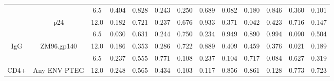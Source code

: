 \documentclass[12pt]{article} %
\begin{document}
\begin{tabular}{ccccccccccccc}
 &  & 6.5 & 0.404 & 0.828 & 0.243 & 0.250 & 0.689 & 0.082 & 0.180 & 0.846 & 0.360 & 0.101\\
\cmidrule{3-13}
 & \multirow{-3}{*}{\centering\arraybackslash p24} & 12.0 & 0.182 & 0.721 & 0.237 & 0.676 & 0.933 & 0.371 & 0.042 & 0.423 & 0.716 & 0.147\\
\cmidrule{2-13}
 &  & 6.5 & 0.030 & 0.631 & 0.244 & 0.750 & 0.234 & 0.949 & 0.890 & 0.994 & 0.090 & 0.504\\
\cmidrule{3-13}
\multirow{-12}{*}{\centering\arraybackslash IgG} & \multirow{-2}{*}{\centering\arraybackslash ZM96.gp140} & 12.0 & 0.186 & 0.353 & 0.286 & 0.722 & 0.889 & 0.409 & 0.459 & 0.376 & 0.021 & 0.189\\
\cmidrule{1-13}
 &  & 6.5 & 0.237 & 0.555 & 0.771 & 0.108 & 0.237 & 0.104 & 0.717 & 0.084 & 0.627 & 0.319\\
\cmidrule{3-13}
\multirow{-2}{*}{\centering\arraybackslash CD4+} & \multirow{-2}{*}{\centering\arraybackslash Any ENV PTEG} & 12.0 & 0.248 & 0.565 & 0.434 & 0.103 & 0.117 & 0.856 & 0.861 & 0.128 & 0.773 & 0.723\\
\bottomrule
\end{tabular} 
\end{document}
